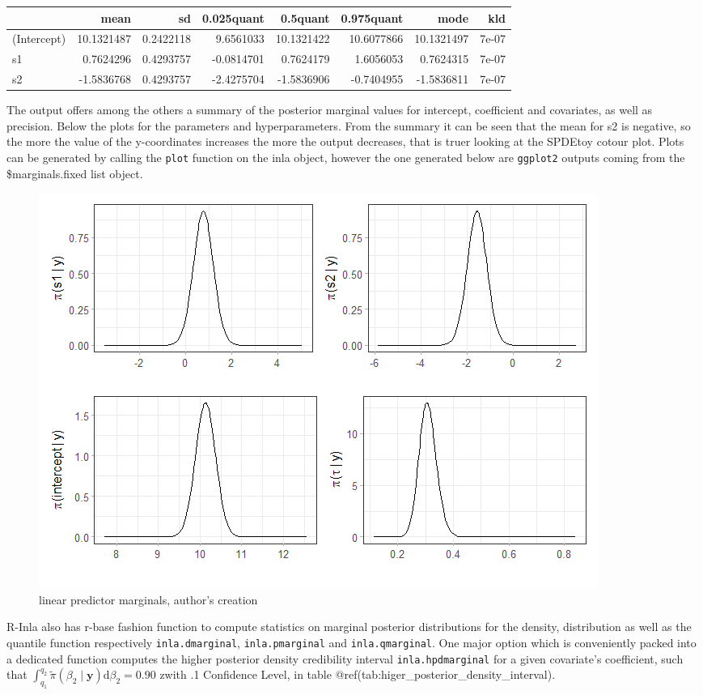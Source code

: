 \documentclass[
  12pt,
  a4paper,
  oneside]{book}
\theoremstyle{definition}
\theoremstyle{definition}
\theoremstyle{definition}
\theoremstyle{remark}
\begin{document}
\begin{tabular}{lrrrrrrr}
\toprule
  & mean & sd & 0.025quant & 0.5quant & 0.975quant & mode & kld\\
\midrule
(Intercept) & 10.1321487 & 0.2422118 & 9.6561033 & 10.1321422 & 10.6077866 & 10.1321497 & 7e-07\\
s1 & 0.7624296 & 0.4293757 & -0.0814701 & 0.7624179 & 1.6056053 & 0.7624315 & 7e-07\\
s2 & -1.5836768 & 0.4293757 & -2.4275704 & -1.5836906 & -0.7404955 & -1.5836811 & 7e-07\\
\bottomrule
\end{tabular}

The output offers among the others a summary of the posterior marginal values for intercept, coefficient and covariates, as well as precision. Below the plots for the parameters and hyperparameters. From the summary it can be seen that the mean for s2 is negative, so the more the value of the y-coordinates increases the more the output decreases, that is truer looking at the SPDEtoy cotour plot. Plots can be generated by calling the \texttt{plot} function on the inla object, however the one generated below are \texttt{ggplot2} outputs coming from the \$marginals.fixed list object.

\begin{figure}
\centering
\includegraphics{images/marginal_distr.png}
\caption{linear predictor marginals, author's creation}
\end{figure}

R-Inla also has r-base fashion function to compute statistics on marginal posterior distributions for the density, distribution as well as the quantile function respectively \texttt{inla.dmarginal}, \texttt{inla.pmarginal} and \texttt{inla.qmarginal}. One major option which is conveniently packed into a dedicated function computes the higher posterior density credibility interval \texttt{inla.hpdmarginal} for a given covariate's coefficient, such that \(\int_{q_{1}}^{q_{2}} \tilde{\pi}\left(\beta_{2} \mid \boldsymbol{y}\right) \mathrm{d} \beta_{2}=0.90\) zwith .1 Confidence Level, in table @ref(tab:higer\_posterior\_density\_interval).
\end{document}
